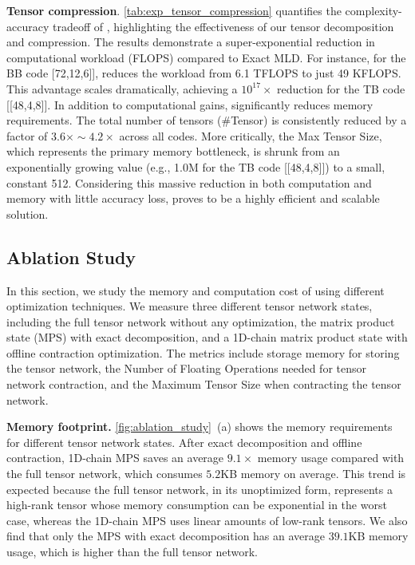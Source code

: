 \textbf{Tensor compression}. \autoref{tab:exp_tensor_compression} quantifies the complexity-accuracy tradeoff of \papername, highlighting the effectiveness of our tensor decomposition and compression. The results demonstrate a super-exponential reduction in computational workload (FLOPS) compared to Exact MLD. For instance, for the BB code [72,12,6]], \papername reduces the workload from 6.1 TFLOPS to just 49 KFLOPS. This advantage scales dramatically, achieving a $10^{17}\times$ reduction for the TB code [[48,4,8]].
In addition to computational gains, \papername significantly reduces memory requirements. The total number of tensors (\#Tensor) is consistently reduced by a factor of $3.6\times \sim 4.2\times$ across all codes. More critically, the Max Tensor Size, which represents the primary memory bottleneck, is shrunk from an exponentially growing value (e.g., 1.0M for the TB code [[48,4,8]]) to a small, constant 512. Considering this massive reduction in both computation and memory with little accuracy loss, \papername proves to be a highly efficient and scalable solution.





\subsection{Ablation Study}

In this section, we study the memory and computation cost of using different optimization techniques. We measure three different tensor network states, including the full tensor network without any
optimization, the matrix product state (MPS) with exact decomposition, and a 1D-chain matrix product state with offline contraction optimization. The metrics include storage memory for storing the tensor network, the Number of Floating Operations needed for tensor network contraction, and the Maximum Tensor Size when contracting the tensor network.

\textbf{Memory footprint.}
\autoref{fig:ablation_study}~(a)  shows the memory requirements for different tensor network states. After exact decomposition and offline contraction, 1D-chain MPS saves an average $9.1\times$ memory usage compared with the full tensor network, which consumes $5.2$KB memory on average. This trend is expected because the full tensor network, in its unoptimized form, represents a high-rank tensor whose memory consumption can be exponential in the worst case, whereas the 1D-chain MPS uses linear amounts of low-rank tensors.
We also find that only the MPS with exact decomposition has an average $39.1$KB memory usage, which is higher than the full tensor network. 


